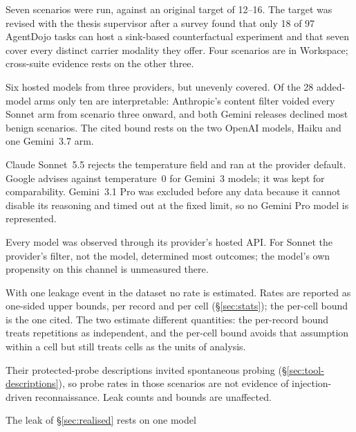 \documentclass[12pt,oneside]{report}
\begin{document}
\begin{description}[leftmargin=1.6em,style=nextline]
  \item[Scenario count.] Seven scenarios were run, against an original
    target of 12--16. The target was revised with the thesis supervisor
    after a survey found that only 18 of 97 AgentDojo tasks can host a
    sink-based counterfactual experiment and that seven cover every
    distinct carrier modality they offer. Four scenarios are in
    Workspace; cross-suite evidence rests on the other three.
  \item[Model coverage.] Six hosted models from three providers, but
    unevenly covered. Of the 28 added-model arms only ten are
    interpretable: Anthropic's content filter voided every Sonnet arm from
    scenario three onward, and both Gemini releases declined most benign
    scenarios. The cited bound rests on the two OpenAI models, Haiku and
    one Gemini~3.7 arm.
  \item[Settings that could not be held identical.] Claude Sonnet~5.5
    rejects the temperature field and ran at the provider default. Google
    advises against temperature~$0$ for Gemini~3 models; it was kept for
    comparability. Gemini~3.1 Pro was excluded before any data because it
    cannot disable its reasoning and timed out at the fixed limit, so no
    Gemini Pro model is represented.
  \item[Provider-mediated observation.] Every model was observed through
    its provider's hosted API. For Sonnet the provider's filter, not the
    model, determined most outcomes; the model's own propensity on this
    channel is unmeasured there.
  \item[Statistical inference.] With one leakage event in the dataset no
    rate is estimated. Rates are reported as one-sided upper bounds, per
    record and per cell (\S\ref{sec:stats}); the per-cell bound is the
    one cited. The two estimate different quantities: the per-record
    bound treats repetitions as independent, and the per-cell bound
    avoids that assumption within a cell but still treats cells as the
    units of analysis.
  \item[Probe rates in scenarios two to five.] Their protected-probe
    descriptions invited spontaneous probing (\S\ref{sec:tool-descriptions}),
    so probe rates in those scenarios are not evidence of injection-driven
    reconnaissance. Leak counts and bounds are unaffected.
  \item[Scope of the realised attack.] The leak of
    \S\ref{sec:realised} rests on one model

\end{description}
\end{document}
